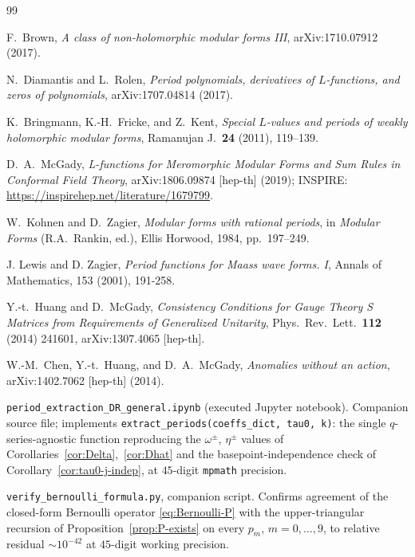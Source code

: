 \documentclass[11pt,letterpaper]{article}
\begin{document}
\begin{thebibliography}{99}

F.\ Brown,
\emph{A class of non-holomorphic modular forms III},
arXiv:1710.07912 (2017).

N.\ Diamantis and L.\ Rolen,
\emph{Period polynomials, derivatives of $L$-functions, and zeros of polynomials},
arXiv:1707.04814 (2017).

K.\ Bringmann, K.-H.\ Fricke, and Z.\ Kent,
\emph{Special $L$-values and periods of weakly holomorphic modular forms},
Ramanujan J.\ \textbf{24} (2011), 119--139.

D.~A.~McGady,
\emph{L-functions for Meromorphic Modular Forms and Sum Rules in Conformal Field Theory},
arXiv:1806.09874 [hep-th] (2019);
INSPIRE: \url{https://inspirehep.net/literature/1679799}.

W.\ Kohnen and D.\ Zagier,
\emph{Modular forms with rational periods},
in \emph{Modular Forms} (R.A.\ Rankin, ed.), Ellis Horwood, 1984, pp.\ 197--249.

J. Lewis and D. Zagier, \emph{Period functions for Maass wave forms. I}, Annals of Mathematics, 153 (2001), 191-258.

Y.-t.\ Huang and D.\ McGady,
\emph{Consistency Conditions for Gauge Theory S Matrices from Requirements of Generalized Unitarity},
Phys.\ Rev.\ Lett.\ \textbf{112} (2014) 241601,
arXiv:1307.4065 [hep-th].

W.-M.\ Chen, Y.-t.\ Huang, and D.\ A.\ McGady,
\emph{Anomalies without an action},
arXiv:1402.7062 [hep-th] (2014).

\texttt{period\_extraction\_DR\_general.ipynb} (executed Jupyter notebook).
Companion source file; implements
\texttt{extract\_periods(coeffs\_dict, tau0, k)}: the single
$q$-series-agnostic function reproducing the $\omega^\pm$, $\eta^\pm$
values of Corollaries~\ref{cor:Delta},~\ref{cor:Dhat} and the
basepoint-independence check of Corollary~\ref{cor:tau0-j-indep}, at
$45$-digit \texttt{mpmath} precision.

\texttt{verify\_bernoulli\_formula.py}, companion script.  Confirms
agreement of the closed-form Bernoulli operator \eqref{eq:Bernoulli-P}
with the upper-triangular recursion of Proposition~\ref{prop:P-exists}
on every $p_m$, $m = 0, \ldots, 9$, to relative residual $\sim 10^{-42}$
at $45$-digit working precision.


\end{thebibliography}
\end{document}
